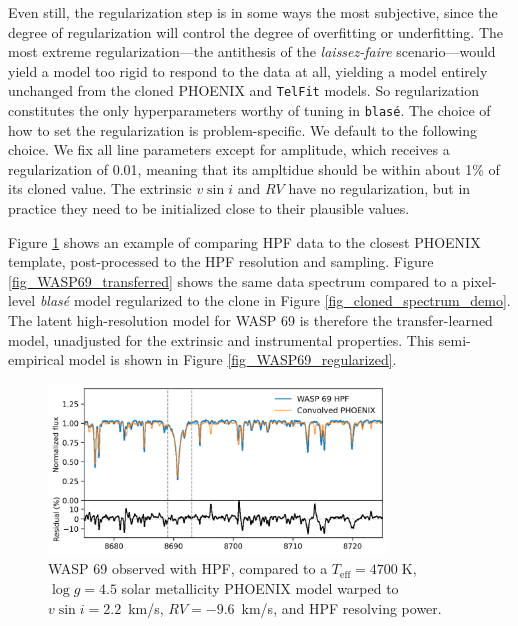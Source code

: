 \documentclass[modern]{aastex631}
\begin{document}
Even still, the regularization step is in some ways the most subjective, since the degree of regularization will control the degree of overfitting or underfitting. The most extreme regularization---the antithesis of the \emph{laissez-faire} scenario---would yield a model too rigid to respond to the data at all, yielding a model entirely unchanged from the cloned PHOENIX and \texttt{TelFit} models.  So regularization constitutes the only hyperparameters worthy of tuning in \texttt{blas\'e}.  The choice of how to set the regularization is problem-specific.  We default to the following choice. We fix all line parameters except for amplitude, which receives a regularization of 0.01, meaning that its ampltidue should be within about 1\% of its cloned value.  The extrinsic $v\sin{i}$ and $RV$ have no regularization, but in practice they need to be initialized close to their plausible values.

Figure \ref{fig_WASP69_demo} shows an example of comparing HPF data to the closest PHOENIX template, post-processed to the HPF resolution and sampling.  Figure \ref{fig_WASP69_transferred} shows the same data spectrum compared to a pixel-level \emph{blas\'e} model regularized to the clone in Figure \ref{fig_cloned_spectrum_demo}.  The latent high-resolution model for WASP 69 is therefore the transfer-learned model, unadjusted for the extrinsic and instrumental properties.  This semi-empirical model is shown in Figure \ref{fig_WASP69_regularized}.


\begin{figure}[hbt!]
    \centering
    \includegraphics[width=0.8\textwidth]{figures/blase_WASP69_demo.png}
    \caption{WASP 69 observed with HPF, compared to a $T_{\mathrm{eff}}=4700\;$K,  $\log{g}=4.5$ solar metallicity PHOENIX model warped to $v\sin{i}=2.2$~km/s, $RV=-9.6$~km/s, and HPF resolving power.}
    \label{fig_WASP69_demo}
\end{figure}
\end{document}
